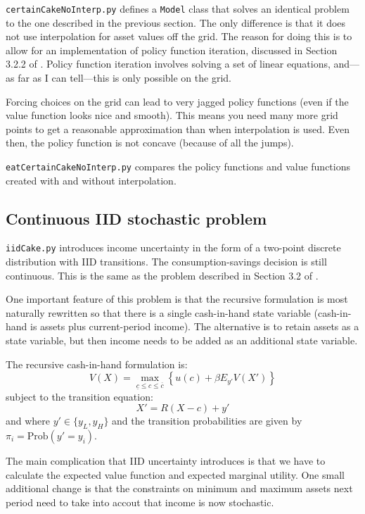 \texttt{certainCakeNoInterp.py} defines a \texttt{Model} class that solves an identical problem to the one described in the previous section. The only difference is that it does not use interpolation for asset values off the grid. The reason for doing this is to allow for an implementation of policy function iteration, discussed in Section 3.2.2 of \citet{adda2003dynamic}. Policy function iteration involves solving a set of linear equations, and---as far as I can tell---this is only possible on the grid.

Forcing choices on the grid can lead to very jagged policy functions (even if the value function looks nice and smooth). This means you need many more grid points to get a reasonable approximation than when interpolation is used. Even then, the policy function is not concave (because of all the jumps).

\texttt{eatCertainCakeNoInterp.py} compares the policy functions and value functions created with and without interpolation.

\subsection{Continuous IID stochastic problem}

\texttt{iidCake.py} introduces income uncertainty in the form of a two-point discrete distribution with IID transitions. The consumption-savings decision is still continuous. This is the same as the problem described in Section 3.2 of \citet{adda2003dynamic}.

One important feature of this problem is that the recursive formulation is most naturally rewritten so that there is a single cash-in-hand state variable (cash-in-hand is assets plus current-period income). The alternative is to retain assets as a state variable, but then income needs to be added as an additional state variable.

The recursive cash-in-hand formulation is:
\begin{equation}
	V(X) = \max_{\underline{c} \leq c \leq \overline{c}} \left\{ u(c) + \beta E_{y'} V(X') \right\}
\end{equation}
subject to the transition equation:
\begin{equation}
	X' = R (X - c) + y'
\end{equation}
and where \(y' \in \{y_L, y_H\}\) and the transition probabilities are given by \(\pi_{i} = \text{Prob}(y' = y_i)\).

The main complication that IID uncertainty introduces is that we have to calculate the expected value function and expected marginal utility. One small additional change is that the constraints on minimum and maximum assets next period need to take into accout that income is now stochastic.

